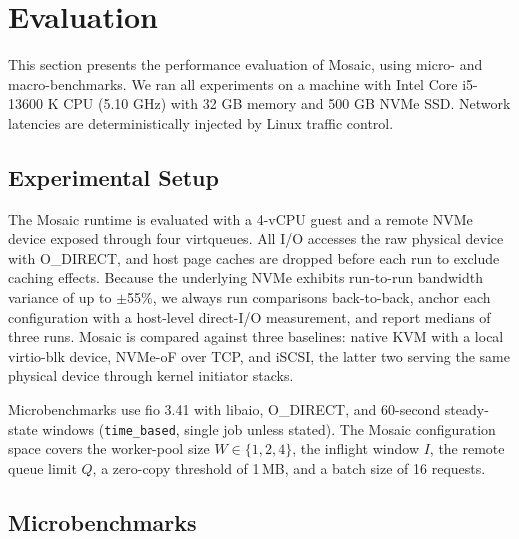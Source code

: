 \documentclass[sigplan,10pt]{acmart}
\begin{document}
\section{Evaluation}\label{eval}
This section presents the performance evaluation of Mosaic, using micro- and macro-benchmarks. We ran all experiments on a machine with Intel Core i5-13600 K CPU (5.10 GHz) with 32 GB memory and 500 GB NVMe SSD. Network latencies are deterministically injected by Linux traffic control.

\subsection{Experimental Setup}
The Mosaic runtime is evaluated with a 4-vCPU guest and a remote NVMe device exposed through four virtqueues. All I/O accesses the raw physical device with O\_DIRECT, and host page caches are dropped before each run to exclude caching effects. Because the underlying NVMe exhibits run-to-run bandwidth variance of up to $\pm$55\%, we always run comparisons back-to-back, anchor each configuration with a host-level direct-I/O measurement, and report medians of three runs. Mosaic is compared against three baselines: native KVM with a local virtio-blk device, NVMe-oF over TCP, and iSCSI, the latter two serving the same physical device through kernel initiator stacks.

Microbenchmarks use fio 3.41 with libaio, O\_DIRECT, and 60-second steady-state windows (\texttt{time\_based}, single job unless stated). The Mosaic configuration space covers the worker-pool size $W \in \{1,2,4\}$, the inflight window $I$, the remote queue limit $Q$, a zero-copy threshold of 1\,MB, and a batch size of 16 requests.

\subsection{Microbenchmarks}
\end{document}
